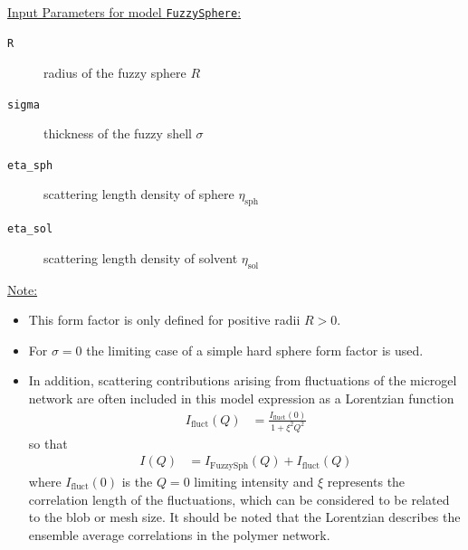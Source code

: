 \vspace{5mm}

\hspace{1pt}\\
\underline{Input Parameters for model \texttt{FuzzySphere}:}\\
\begin{description}
\item[\texttt{R}] radius of the fuzzy sphere  $R$
\item[\texttt{sigma}] thickness of the fuzzy shell $\sigma$
\item[\texttt{eta\_sph}] scattering length density of sphere
$\eta_\text{sph}$ \item[\texttt{eta\_sol}] scattering length
density of solvent $\eta_\text{sol}$
\end{description}

\noindent\underline{Note:}
\begin{itemize}
\item This form factor is only defined for positive radii $R>0$.
\item For $\sigma = 0$ the limiting case of a simple hard sphere
form factor is used. \item In addition, scattering contributions
arising from fluctuations of the microgel network are often
included in this model expression as a Lorentzian function
\begin{align}
I_\text{fluct}(Q) &= \frac{I_\text{fluct}(0)}{1+\xi^2Q^2}
\end{align}
so that
\begin{align}
I(Q) &= I_\text{FuzzySph}(Q)+I_\text{fluct}(Q)
\end{align}
where $I_\text{fluct}(0)$ is the $Q=0$ limiting intensity and
$\xi$ represents the correlation length of the fluctuations, which
can be considered to be related to the blob or mesh size. It
should be noted that the Lorentzian describes the ensemble average
correlations in the polymer network.

\end{itemize}

